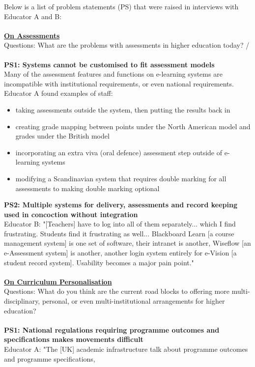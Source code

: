 Below is a list of problem statements (PS) that were raised in interviews with Educator A and B:\\
\\
\underline{\textbf{On Assessments}}
\\
Questions: What are the problems with assessments in higher education today? / \\
\\
\textbf{PS1: Systems cannot be customised to fit assessment models}\\
Many of the assessment features and functions on e-learning systems are incompatible 
with institutional requirements, or even national requirements. Educator A found examples of staff:
\begin{itemize}
    \item taking assessments outside the system, then putting the results back in
    \item creating grade mapping between points under the North American model and 
    grades under the British model
    \item incorporating an extra viva (oral defence) assessment step outside of e-learning systems
    \item modifying a Scandinavian system that requires double marking for all assessments 
    to making double marking optional
\end{itemize}
\textbf{PS2: Multiple systems for delivery, assessments and record keeping used in concoction without integration}\\
Educator B: "[Teachers] have to log into all of them separately... which I find frustrating. Students 
find it frustrating as well... Blackboard Learn [a course management system] is one set of software, 
their intranet is another, Wiseflow [an e-Assessment system] is another, another login system entirely 
for e-Vision [a student record system]. Usability becomes a major pain point."\\
\\
\underline{\textbf{On Curriculum Personalisation}}
\\
Questions: What do you think are the current road blocks to offering more multi-disciplinary, personal, 
or even multi-institutional arrangements for higher education?
\\\\
\textbf{PS1: National regulations requiring programme outcomes and specifications makes movements 
difficult}\\
Educator A: "The [UK] academic infrastructure talk about programme outcomes and programme specifications,
